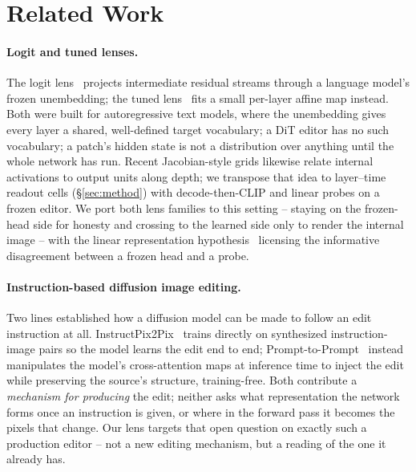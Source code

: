 \section{Related Work}\label{sec:related}

\paragraph{Logit and tuned lenses.} The logit
lens~\citep{nostalgebraist2020logitlens} projects intermediate residual
streams through a language model's frozen unembedding; the tuned
lens~\citep{belrose2023tuned} fits a small per-layer affine map instead.
Both were built for autoregressive text models, where the unembedding
gives every layer a shared, well-defined target vocabulary; a DiT
editor has no such vocabulary; a patch's hidden state is not a
distribution over anything until the whole network has run. Recent
Jacobian-style grids likewise relate internal activations to output
units along depth; we transpose that idea to layer--time readout cells
(\S\ref{sec:method}) with decode-then-CLIP and linear probes on a frozen
editor. We port both lens families to this setting -- staying on the
frozen-head side for honesty and crossing to the learned side only to
render the internal image -- with the linear representation
hypothesis~\citep{park2024linear} licensing the informative
disagreement between a frozen head and a probe.

\paragraph{Instruction-based diffusion image editing.} Two lines
established how a diffusion model can be made to follow an edit
instruction at all. InstructPix2Pix~\citep{brooks2023instructpix2pix}
trains directly on synthesized instruction-image pairs so the model
learns the edit end to end; Prompt-to-Prompt~\citep{hertz2023prompttoprompt}
instead manipulates the model's cross-attention maps at inference time
to inject the edit while preserving the source's structure, training-free.
Both contribute a \emph{mechanism for producing} the edit; neither asks
what representation the network forms once an instruction is given, or
where in the forward pass it becomes the pixels that change. Our lens
targets that open question on exactly such a production editor -- not a
new editing mechanism, but a reading of the one it already has.


